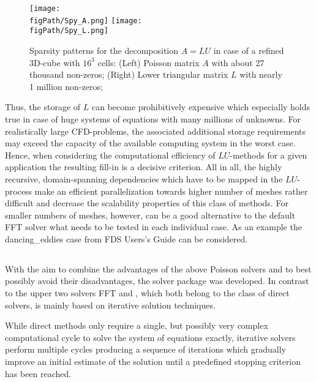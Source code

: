 \begin{figure}[h]
\begin{center}
\texttt{[image: \\figPath/Spy\_A.png]}\qquad\qquad\qquad
\texttt{[image: \\figPath/Spy\_L.png]}\\
\end{center}
\caption[Sparsity patterns for the decomposition $A=LU$ in case of a refined 3D-cube with $16^3$ cells]{
Sparsity patterns for the decomposition $A=LU$ in case of a refined 3D-cube with $16^3$ cells:
(Left) Poisson matrix $A$ with about 27 thousand non-zeros; (Right) Lower triangular matrix $L$ with nearly 1 million non-zeros;
}
\label{FIG_SCARC_lu_memory_spy}
\end{figure}

Thus, the storage of $L$ can become prohibitively expensive which especially holds true in case of huge systems of equations with many millions of unknowns. 
For realistically large CFD-problems, the associated additional storage requirements may exceed the capacity of the available computing system in the worst case. Hence, when considering the computational efficiency of $LU$-methods for a given application the resulting fill-in is a decisive criterion.
All in all, the highly recursive, domain-spanning dependencies which have to be mapped in the $LU$-process
make an efficient parallelization towards higher number of meshes rather difficult and decrease the scalability properties of this class of methods. For smaller numbers of meshes, however, \uglmat{} can be a good alternative to the default FFT solver what needs to be tested in each individual case. As an example the {\ct dancing\_eddies} case from FDS Users's Guide can be considered.


\subsection{\scarc{}}
With the aim to combine the advantages of the above Poisson solvers and to best possibly avoid their disadvantages, the solver package \scarc{} was developed. In contrast to the upper two solvers FFT and \uglmat{}, which both belong to the class of direct solvers, \scarc{} is mainly based on iterative solution techniques.

While direct methods only require a single, but possibly very complex computational cycle to solve the system of equations exactly, iterative solvers perform multiple cycles producing a sequence of iterations which gradually improve an initial estimate of the solution until a predefined stopping criterion has been reached. 

